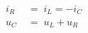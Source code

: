 \documentclass[12pt]{article}
\begin{document}
\sicpsize

\begin{align*}
i_R \; &= \; i_L = -i_C\\
u_C \; &= \; u_L + u_R
\end{align*}
\end{document}
